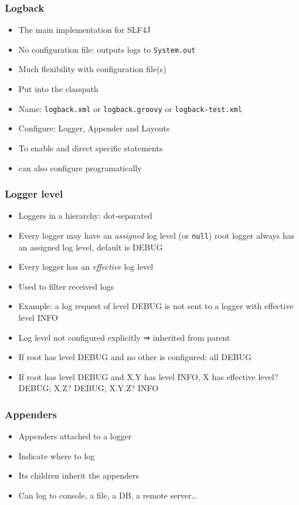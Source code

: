 \documentclass[french, english]{beamer}
\begin{document}
\begin{frame}
	\frametitle{Logback}
	\begin{itemize}
		\item The main implementation for SLF4J
		\item No configuration file: outputs logs to \texttt{System.out}
		\item Much flexibility with configuration file(s)
		\item Put into the classpath
		\item Name: \texttt{logback.xml} {\tiny or \texttt{logback.groovy} or \texttt{logback-test.xml}}
		\item Configure: Logger, Appender and Layouts
		\item To enable and direct specific statements
		\item {\tiny can also configure programatically}
	\end{itemize}
\end{frame}

\begin{frame}
	\frametitle{Logger level}
	\begin{itemize}
		\item Loggers in a hierarchy: dot-separated
		\item Every logger may have an \emph{assigned} log level (or \texttt{null}) {\tiny root logger always has an assigned log level, default is DEBUG}
		\item Every logger has an \emph{effective} log level
		\item Used to filter received logs
		\item Example: a log request of level DEBUG is not sent to a logger with effective level INFO
		\item Log level not configured explicitly ⇒ inherited from parent
		\item If root has level DEBUG and no other is configured: all DEBUG
		\item If root has level DEBUG and X.Y has level INFO, X has effective level? \pause DEBUG; X.Z? \pause DEBUG; X.Y.Z? INFO
	\end{itemize}
\end{frame}

\begin{frame}
	\frametitle{Appenders}
	\begin{itemize}
		\item Appenders attached to a logger
		\item Indicate where to log
		\item Its children inherit the appenders
		\item Can log to console, a file, a DB, a remote server…
	\end{itemize}
\end{frame}
\end{document}
